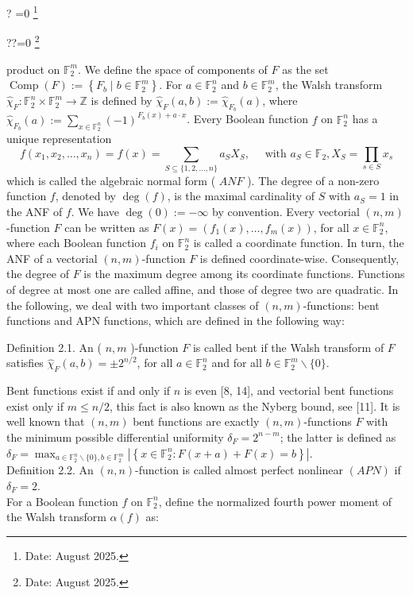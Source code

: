 \documentclass[10pt]{article}
\let\svthefootnote\thefootnote
\newcommand\blfootnotetext[1]{%
  \let\thefootnote\relax\footnote{#1}%
  \addtocounter{footnote}{-1}%
  \let\thefootnote\svthefootnote%
}
\let\svfootnotetext\footnotetext
\renewcommand\footnotetext[2][?]{%
  \if\relax#1\relax%
    \ifnum\value{footnote}=0\blfootnotetext{#2}\else\svfootnotetext{#2}\fi%
  \else%
    \if?#1\ifnum\value{footnote}=0\blfootnotetext{#2}\else\svfootnotetext{#2}\fi%
    \else\svfootnotetext[#1]{#2}\fi%
  \fi
}
\begin{document}
product on $\mathbb{F}_{2}^{m}$. We define the space of components of $F$ as the set $\operatorname{Comp}(F):=\left\{F_{b} \mid b \in \mathbb{F}_{2}^{m}\right\}$. For $a \in \mathbb{F}_{2}^{n}$ and $b \in \mathbb{F}_{2}^{m}$, the Walsh transform $\hat{\chi}_{F}: \mathbb{F}_{2}^{n} \times \mathbb{F}_{2}^{m} \rightarrow \mathbb{Z}$ is defined by $\hat{\chi}_{F}(a, b):=\hat{\chi}_{F_{b}}(a)$, where $\hat{\chi}_{F_{b}}(a):=\sum_{x \in \mathbb{F}_{2}^{n}}(-1)^{F_{b}(x)+a \cdot x}$. Every Boolean function $f$ on $\mathbb{F}_{2}^{n}$ has a unique representation
$$
f\left(x_{1}, x_{2}, \ldots, x_{n}\right)=f(x)=\sum_{S \subseteq\{1,2, \ldots, n\}} a_{S} X_{S}, \quad \text { with } a_{S} \in \mathbb{F}_{2}, X_{S}=\prod_{s \in S} x_{s}
$$
which is called the algebraic normal form ( $A N F$ ). The degree of a non-zero function $f$, denoted by $\operatorname{deg}(f)$, is the maximal cardinality of $S$ with $a_{S}=1$ in the ANF of $f$. We have $\operatorname{deg}(0):=-\infty$ by convention. Every vectorial $(n, m)$-function $F$ can be written as $F(x)=\left(f_{1}(x), \ldots, f_{m}(x)\right)$, for all $x \in \mathbb{F}_{2}^{n}$, where each Boolean function $f_{i}$ on $\mathbb{F}_{2}^{n}$ is called a coordinate function. In turn, the ANF of a vectorial $(n, m)$-function $F$ is defined coordinate-wise. Consequently, the degree of $F$ is the maximum degree among its coordinate functions. Functions of degree at most one are called affine, and those of degree two are quadratic. In the following, we deal with two important classes of $(n, m)$-functions: bent functions and APN functions, which are defined in the following way:

Definition 2.1. An ( $n, m$ )-function $F$ is called bent if the Walsh transform of $F$ satisfies $\hat{\chi}_{F}(a, b)= \pm 2^{n / 2}$, for all $a \in \mathbb{F}_{2}^{n}$ and for all $b \in \mathbb{F}_{2}^{m} \backslash\{0\}$.

Bent functions exist if and only if $n$ is even [8, 14], and vectorial bent functions exist only if $m \leq n / 2$, this fact is also known as the Nyberg bound, see [11]. It is well known that $(n, m)$ bent functions are exactly $(n, m)$-functions $F$ with the minimum possible differential uniformity $\delta_{F}=2^{n-m}$; the latter is defined as $\delta_{F}=\max _{a \in \mathbb{F}_{2}^{n} \backslash\{0\}, b \in \mathbb{F}_{2}^{m}}\left|\left\{x \in \mathbb{F}_{2}^{n}: F(x+a)+F(x)=b\right\}\right|$.\\
Definition 2.2. An $(n, n)$-function is called almost perfect nonlinear $(A P N)$ if $\delta_{F}=2$.\\
For a Boolean function $f$ on $\mathbb{F}_{2}^{n}$, define the normalized fourth power moment of the Walsh transform $\alpha(f)$ as:
\end{document}
